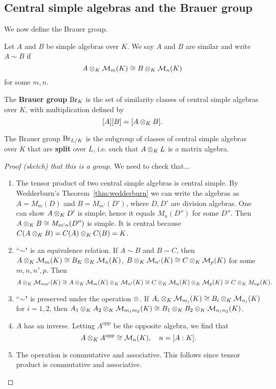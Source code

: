 \subsection{Central simple algebras and the Brauer group}
We now define the Brauer group.
\begin{df}
Let $A$ and $B$ be simple algebras over $K$. We say $A$ and $B$ are similar and write $A\sim B$ if
\[
A\otimes_K\mathcal{M}_m(K)\cong B\otimes_K \mathcal{M}_n(K)
\]
for some $m,n$.

The \textbf{Brauer group} $\operatorname{Br}_K$ is the set of similarity classes of central simple algebras over $K$, with multiplication defined by
\[
[A][B]=[A\otimes_K B].
\]

The Brauer group $\operatorname{Br}_{L/K}$ is the subgroup of classes of central simple algebras over $K$ that are \textbf{split} over $L$, i.e. such that $A\otimes_K L$ is a matrix algebra.
\end{df}
\begin{proof}[Proof (sketch) that this is a group]
We need to check that$\ldots$
\begin{enumerate}
\item The tensor product of two central simple algebras is central simple. By Wedderburn's Theorem~\ref{thm:wedderburn} we can write the algebras as $A=M_m(D)$ and $B=M_{m'}(D')$, where $D,D'$ are division algebras. One can show $A\otimes_K D'$ is simple; hence it equals $M_n(D'')$ for some $D''$. Then $A\otimes_K B\cong M_{m'n}(D'')$ is simple. It is central because $C(A\otimes_K B)=C(A)\otimes_KC(B)=K$.
\item
``$\sim$" is an equivalence relation. If $A\sim B$ and $B\sim C$, then $A\otimes_K \mathcal{M}_m(K)\cong B_K\otimes_K \mathcal{M}_n(K)$, $B\otimes_K\mathcal{M}_{n'}(K)\cong C\otimes_K \mathcal{M}_p(K)$ for some $m,n,n',p$. Then
\[
A\otimes_K \mathcal{M}_{mn'}(K)\cong A\otimes_K \mathcal{M}_m(K)\otimes_K \mathcal{M}_{n'}(K)\cong C\otimes_K\mathcal{M}_n(K)\otimes_K \mathcal{M}_p(K)\cong C\otimes_K M_{np}(K).
\]
\item
``$\sim$" is preserved under the operation $\otimes$. If $A_i\otimes_K \mathcal{M}_{m_i}(K)\cong B_i\otimes_K \mathcal{M}_{n_i}(K)$ for $i=1,2$, then $A_1\otimes_K A_2\otimes_K \mathcal{M}_{m_1m_2}(K)\cong B_1\otimes_K B_2\otimes_K \mathcal{M}_{n_1n_2}(K)$.
\item
$A$ has an inverse. Letting $A^{\text{opp}}$ be the opposite algebra, we find that
\[
A\otimes_K A^{\text{opp}}\cong \mathcal{M}_n(K),\quad n=[A:K].
\]
\item
The operation is commutative and associative. This follows since tensor product is commutative and associative.
\end{enumerate}
\end{proof}
